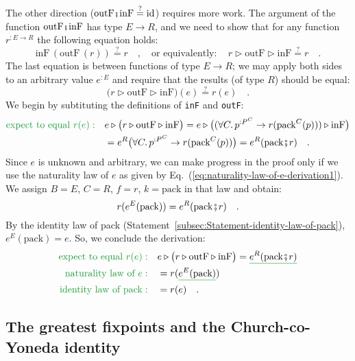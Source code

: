 The other direction ($\text{outF}\bef\text{inF}\overset{?}{=}\text{id}$)
requires more work. The argument of the function $\text{outF}\bef\text{inF}$
has type $E\rightarrow R$, and we need to show that for any function
$r^{:E\rightarrow R}$ the following equation holds: 
\[
\text{inF}\,(\text{outF}\,(r))\overset{?}{=}r\quad,\quad\text{or equivalently}:\quad r\triangleright\text{outF}\triangleright\text{inF}\overset{?}{=}r\quad.
\]
The last equation is between functions of type $E\rightarrow R$;
we may apply both sides to an arbitrary value $e^{:E}$ and require
that the results (of type $R$) should be equal:
\[
\big(r\triangleright\text{outF}\triangleright\text{inF}\big)(e)\overset{?}{=}r(e)\quad.
\]
We begin by subtituting the definitions of \lstinline!inF! and \lstinline!outF!:
\begin{align*}
{\color{greenunder}\text{expect to equal }r(e):}\quad & e\triangleright\big(r\triangleright\text{outF}\triangleright\text{inF}\big)=e\triangleright\big((\forall C.\,p^{:P^{C}}\rightarrow r(\text{pack}^{C}(p)))\triangleright\text{inF}\big)\\
 & =e^{R}\big(\forall C.\,p^{:P^{C}}\rightarrow r(\text{pack}^{C}(p))\big)=e^{R}(\text{pack}\bef r)\quad.
\end{align*}
Since $e$ is unknown and arbitrary, we can make progress in the proof
only if we use the naturality law of $e$ as given by Eq.~(\ref{eq:naturality-law-of-e-derivation1}).
We assign $B=E$, $C=R$, $f=r$, $k=\text{pack}$ in that law and
obtain:
\[
r(e^{E}(\text{pack}))=e^{R}(\text{pack}\bef r)\quad.
\]
By the identity law of pack (Statement~\ref{subsec:Statement-identity-law-of-pack}),
$e^{E}(\text{pack})=e$. So, we conclude the derivation:
\begin{align*}
{\color{greenunder}\text{expect to equal }r(e):}\quad & e\triangleright\big(r\triangleright\text{outF}\triangleright\text{inF}\big)=\gunderline{e^{R}(\text{pack}\bef r)}\\
{\color{greenunder}\text{naturality law of }e:}\quad & =r(\gunderline{e^{E}(\text{pack})})\\
{\color{greenunder}\text{identity law of }\text{pack}:}\quad & =r(e)\quad.
\end{align*}


\subsection{The greatest fixpoints and the Church-co-Yoneda identity\label{subsec:The-greatest-fixpoints-and-Church-co-Yoneda}}

